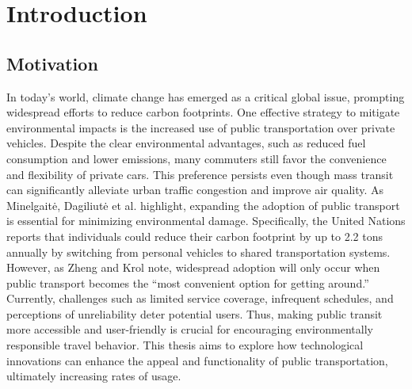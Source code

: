 \chapter{Introduction}
\label{cha:Introduction}

\section{Motivation}
In today’s world, climate change has emerged as a critical global issue, prompting widespread efforts to reduce carbon footprints. One effective strategy to mitigate environmental impacts is the increased use of public transportation over private vehicles. Despite the clear environmental advantages, such as reduced fuel consumption and lower emissions, many commuters still favor the convenience and flexibility of private cars. This preference persists even though mass transit can significantly alleviate urban traffic congestion and improve air quality. As Minelgait\.{e}, Dagiliut\.{e} et al. \cite{minelgaitė2020sustainability} highlight, expanding the adoption of public transport is essential for minimizing environmental damage. Specifically, the United Nations \cite{un2023} reports that individuals could reduce their carbon footprint by up to 2.2 tons annually by switching from personal vehicles to shared transportation systems. However, as Zheng and Krol \cite{mit2023} note, widespread adoption will only occur when public transport becomes the “most convenient option for getting around.” Currently, challenges such as limited service coverage, infrequent schedules, and perceptions of unreliability deter potential users. Thus, making public transit more accessible and user-friendly is crucial for encouraging environmentally responsible travel behavior. This thesis aims to explore how technological innovations can enhance the appeal and functionality of public transportation, ultimately increasing rates of usage.

